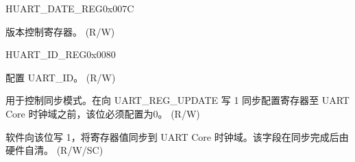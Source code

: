 \begin{register}{H}{UART\_DATE\_REG}{0x007C}\label{regdesc:UARTDATEREG}
%
\regnewline%
\begin{regdesc}\begin{reglist}
\label{fielddesc:UARTDATE}\item [UART\_DATE] 版本控制寄存器。 (R/W)
\end{reglist}\end{regdesc}
\end{register}


\begin{register}{H}{UART\_ID\_REG}{0x0080}\label{regdesc:UARTIDREG}
%
%
%
\regnewline%
\begin{regdesc}\begin{reglist}
\label{fielddesc:UARTID}\item [UART\_ID] 配置 UART\_ID。 (R/W)
\label{fielddesc:UARTUPDATECTRL}\item [UART\_UPDATE\_CTRL] 用于控制同步模式。在向 UART\_REG\_UPDATE 写 1 同步配置寄存器至 UART Core 时钟域之前，该位必须配置为0。 (R/W)
\label{fielddesc:UARTREGUPDATE}\item [UART\_REG\_UPDATE] 软件向该位写 1，将寄存器值同步到 UART Core 时钟域。该字段在同步完成后由硬件自清。 (R/W/SC)
\end{reglist}\end{regdesc}
\end{register}
